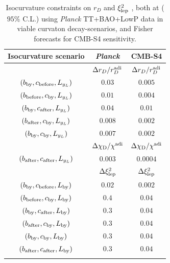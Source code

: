 \begin{table}[htbp!]
\begin{center}
\begin{tabular}{ccc}
\hline
{\rm Isocurvature scenario} &  \emph{Planck} & CMB-S4 \\ \hline
  & $ \Delta r_D/r_{D}^{\rm adi}$ &$ \Delta r_D/r_{D}^{\rm adi}$\\ 
$(b_{\rm by},c_{\rm before},L_{y_{L}})$ & $0.03$&$0.005$\\
$(b_{\rm before},c_{\rm by},L_{y_{L}})$ &  $0.01$ &$0.004$\\
$(b_{\rm by},c_{\rm after},L_{y_{L}})$ &  $0.04$&$0.01$\\
$(b_{\rm after},c_{\rm by},L_{y_{L}})$ & $0.008$&$0.002$\\
$(b_{\rm by},c_{\rm by},L_{y_{L}})$ &  $0.007$&$0.002$\\ \hline 
& $\Delta \chi_{\rm D}/\chi_{\rm }^{\rm adi}$&$\Delta \chi_{\rm D}/\chi_{\rm }^{\rm adi}$ \\
$(b_{\rm after},c_{\rm after},L_{y_{L}})$ & $0.003$&$0.0004$ \\ \hline 
 &  $\Delta \xi^{2}_{\rm lep}$ &$\Delta \xi^{2}_{\rm lep}$\\
$(b_{\rm by},c_{\rm before},L_{\rm by})$ &$0.02$ &$0.002$\\
$(b_{\rm before},c_{\rm by},L_{\rm by})$ &$0.4$  & $0.04$\\
$(b_{\rm by},c_{\rm after},L_{\rm by})$ &$0.3$  &$0.04$\\
$(b_{\rm after},c_{\rm by},L_{\rm by})$ & $0.3$&$0.04$\\
$(b_{\rm by},c_{\rm by},L_{\rm by})$ & $0.3$ & $0.04$\\
$(b_{\rm after},c_{\rm after},L_{\rm by})$ & $0.3$ & $0.04$\\
\\ \hline \hline 
\end{tabular}
\caption{Isocurvature constraints on $r_D$ and $\xi_{\rm lep}^{2}$ , both at ($95\%$ C.L.) using \textit{Planck} TT+BAO+LowP data \cite{Smith:2015bln} in viable curvaton decay-scenarios, and Fisher forecasts for CMB-S4 sensitivity. 
\label{limits_rd}}
\end{center}
\end{table}
%

